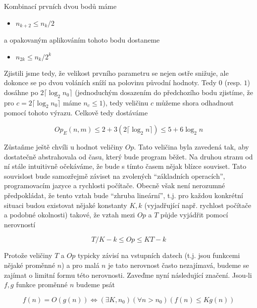 Kombinací prvních dvou bodů máme

\begin{itemize}
 \item $n_{k+2}\leq n_k/2$
\end{itemize}

a opakovaným aplikováním tohoto bodu dostaneme

\begin{itemize}
 \item $n_{2k}\leq n_k/2^{k}$
\end{itemize}

Zjistili jsme tedy, že velikost prvního parametru se nejen ostře snižuje, ale dokonce se po dvou voláních sníží na polovinu původní hodnoty. Tedy
$0$ (resp. $1$) dosáhne po $2\lceil \log_2 n_0\rceil$ (jednoduchým dosazením do předchozího bodu zjistíme, že pro $c=2\lceil \log_2 n_0\rceil$ máme
$n_c\leq1$), tedy veličinu $c$ můžeme shora odhadnout pomocí tohoto výrazu. Celkově tedy dostáváme

\begin{displaymath}
 Op_E(n,m) \leq 2 + 3(2\lceil \log_2 n\rceil)\leq 5 + 6\log_2 n
\end{displaymath}

Zůstaňme ještě chvíli u hodnot veličiny $Op$. Tato veličina byla zavedená tak, aby dostatečně abstrahovala od času, který bude program běžet.
Na druhou stranu od ní stále intuitivně očekáváme, že bude s tímto časem nějak blízce souviset. Tato souvislost bude samozřejmě záviset na
zvolených ``základních operacích'', programovacím jazyce a rychlosti počítače. Obecně však není nerozumné předpokládat, že tento vztah bude
``zhruba lineární'', t.j. pro každou konkrétní situaci budou existovat nějaké konstanty $K,k$ (vyjadřující např. rychlost počítače a podobné okolnosti) takové,
že vztah mezi $Op$ a $T$ půjde vyjádřit pomocí nerovností

\begin{displaymath}
 T/K - k \leq Op \leq KT - k
\end{displaymath}

Protože veličiny $T$ a $Op$ typicky závisí na vstupních datech (t.j. jsou funkcemi nějaké proměnné $n$) a pro malá $n$ je tato nerovnost často
nezajímavá, budeme se zajímat o limitní formu této nerovnosti. Zaveďme nyní následující značení. Jsou-li $f,g$ funkce proměnné $n$ budeme psát

\begin{displaymath}
 f(n) = O(g(n)) \iff (\exists K,n_0)(\forall n>n_0)(f(n)\leq Kg(n))
\end{displaymath}

